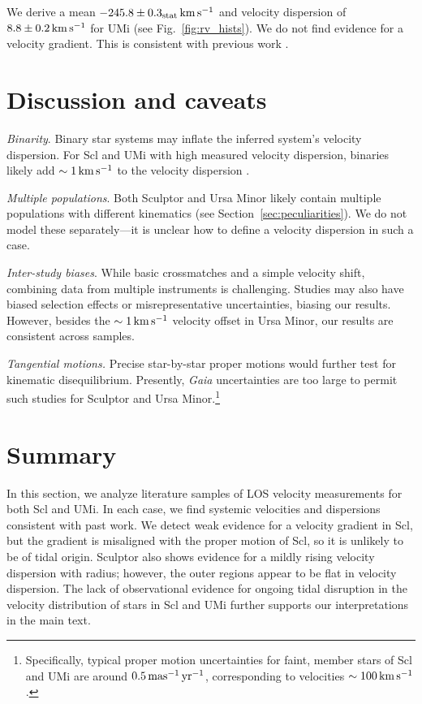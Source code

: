 We derive a mean \(-245.8\pm0.3_{\rm stat}\,{\rm km\,s^{-1}}\) and velocity
dispersion of \(8.8\pm0.2\,{\rm km\,s^{-1}}\) for UMi (see Fig.~\ref{fig:rv_hists}).
We do not find evidence for a velocity gradient. This is consistent with
previous work \citetext{\citealp{pace+2020}; \citealp[somewhat
with][]{spencer+2018}; \citealp{martinez-garcia+2023}}.

\section{Discussion and caveats}\label{discussion-and-caveats}

\emph{Binarity}. Binary star systems may inflate the inferred system's
velocity dispersion. For Scl and UMi with high measured velocity
dispersion, binaries likely add \(\sim 1\,{\rm km\,s^{-1}}\) to the velocity
dispersion \citep{spencer+2018, gration+2025}.

\emph{Multiple populations}. Both Sculptor and Ursa Minor likely contain
multiple populations with different kinematics (see
Section~\ref{sec:peculiarities}). We do not model these separately---it
is unclear how to define a velocity dispersion in such a case.

\emph{Inter-study biases}. While basic crossmatches and a simple
velocity shift, combining data from multiple instruments is challenging.
Studies may also have biased selection effects or misrepresentative
uncertainties, biasing our results. However, besides the \(\sim1\,{\rm km\,s^{-1}}\)
velocity offset in Ursa Minor, our results are consistent across
samples.

\emph{Tangential motions.} Precise star-by-star proper motions would
further test for kinematic disequilibrium. Presently, \emph{Gaia}
uncertainties are too large to permit such studies for Sculptor and Ursa
Minor.\footnote{Specifically, typical proper motion uncertainties for
  faint, member stars of Scl and UMi are around \(0.5\,{\rm mas^{-1}\,yr^{-1}}\),
  corresponding to velocities \(\sim 100\,{\rm km\,s^{-1}}\).}

\section{Summary}\label{summary}

In this section, we analyze literature samples of LOS velocity
measurements for both Scl and UMi. In each case, we find systemic
velocities and dispersions consistent with past work. We detect weak
evidence for a velocity gradient in Scl, but the gradient is misaligned
with the proper motion of Scl, so it is unlikely to be of tidal origin.
Sculptor also shows evidence for a mildly rising velocity dispersion
with radius; however, the outer regions appear to be flat in velocity
dispersion. The lack of observational evidence for ongoing tidal
disruption in the velocity distribution of stars in Scl and UMi further
supports our interpretations in the main text.
